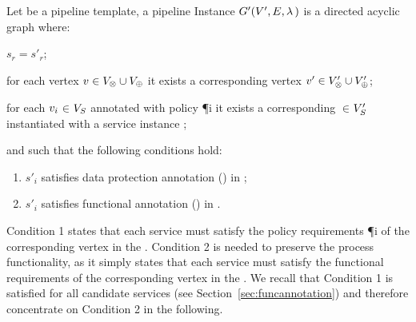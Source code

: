     \begin{definition}\label{def:instance}
      Let \tChartFunction be a pipeline template, a pipeline Instance $G'(V',E,\lambda\,)$ is a directed acyclic graph where:
      \begin{enumerate*}[label=\textit{\roman*})]
        \item $s_r$$=$$s'_r$;
        \item for each vertex $v_{}\in V_{\otimes}\cup V_{\oplus}$ it exists a corresponding vertex $v'_{}\in V'_{\otimes}\cup V'_{\oplus}$;
        \item for each $v_{i}$$\in$$V_S$ annotated with policy \P{i} it exists a corresponding $\in$$V'_S$ instantiated with a service instance ;
      \end{enumerate*}
      and such that the following conditions hold:
      \begin{enumerate}[label=\arabic*)]
        \item $s'_i$ satisfies data protection annotation \myLambda() in \tChartFunction;
        \item $s'_i$ satisfies functional annotation \myGamma() in \tChartFunction.
      \end{enumerate}
    \end{definition}

Condition 1 states that each service  must satisfy the policy requirements \P{i} of the corresponding vertex  in the \pipelineTemplate.
Condition 2 is needed to preserve the process functionality, as it simply states that each service  must satisfy the functional requirements  of the corresponding vertex  in the \pipelineTemplate. We recall that Condition 1 is satisfied for all candidate services (see Section~\ref{sec:funcannotation}) and therefore concentrate on Condition 2 in the following.

